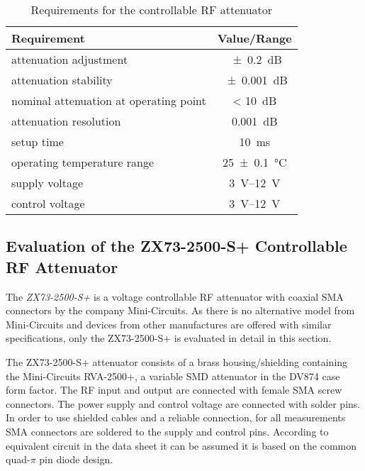 \begin{table}[tbh]
\caption{Requirements for the controllable RF attenuator}
\label{tab:interfacingFlute_rfattenrequirements}
\centering
\begin{tabular}{lc}
\toprule
Requirement & {Value/Range}\\
\midrule
attenuation adjustment & \SI{\pm0.2}{\dB}\\
attenuation stability & \SI{\pm0.001}{\dB}\\
nominal attenuation at operating point & < \SI{10}{\dB}\\
attenuation resolution & \SI{0.001}{\dB}\\
setup time & \SI{10}{\milli\second}\\
operating temperature range & \SI{25\pm0.1}{\celsius}\\
supply voltage & \SIrange{3}{12}{\volt}\\
control voltage & \SIrange{3}{12}{\volt}\\
\bottomrule
\end{tabular}
\end{table}

\subsection{Evaluation of the ZX73-2500-S+ Controllable RF Attenuator}
The \textit{ZX73-2500-S+} is a voltage controllable RF attenuator with coaxial SMA connectors by the company Mini-Circuits. As there is no alternative model from Mini-Circuits and devices from other manufactures are offered with similar specifications, only the ZX73-2500-S+ is evaluated in detail in this section.

The ZX73-2500-S+ attenuator consists of a brass housing/shielding containing the Mini-Circuits RVA-2500+, a variable SMD attenuator in the DV874 case form factor. The RF input and output are connected with female SMA screw connectors. The power supply and control voltage are connected with solder pins. In order to use shielded cables and a reliable connection, for all measurements SMA connectors are soldered to the supply and control pins. According to equivalent circuit in the data sheet\cite{mini-circuitsZX732500VoltageVariable} it can be assumed it is based on the common quad-$\pi$ pin diode design\cite{waughLowCostSurfaceMount1992}.

